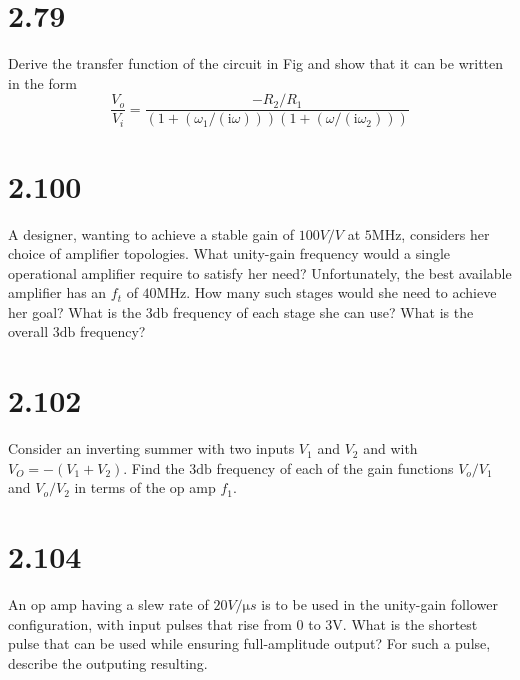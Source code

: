 \documentclass[12pt, a4paper]{article}
\newcommand{\svol}{\si{\volt}}
\newcommand{\sdb}{\si{\decibel}}
\newcommand{\img}{\mathrm{i}}
\begin{document}
\section{2.79}
Derive the transfer function of the circuit in Fig and show that it can be written in the form
\[
  \frac{V_o}{V_i} = \frac{-R_2/R_1}{\left(1+(\omega_1/(\img\omega))\right)\left(1+(\omega/(\img\omega_2))\right)}
\]


\section{2.100}
A designer, wanting to achieve a stable gain of $100 \si{V/V}$ at $5 \si{\mega\hertz}$, considers her choice of amplifier topologies. What unity-gain frequency would a single operational amplifier require to satisfy her need? Unfortunately, the best available amplifier has an $f_t$ of $40 \si{\mega\hertz}$. How many such stages would she need to achieve her goal? What is the $3\sdb$ frequency of each stage she can use? What is the overall $3\sdb$ frequency?

\section{2.102}
Consider an inverting summer with two inputs $V_1$ and $V_2$ and with $V_O = -(V_1 + V_2)$. Find the $3 \sdb$ frequency of each of the gain functions $V_o / V_1$ and $V_o / V_2$ in terms of the op amp $f_1$.

\section{2.104}
An op amp having a slew rate of $20 \si{V/\micro s}$ is to be used in the unity-gain follower configuration, with input pulses that rise from $0$ to $3\svol$. What is the shortest pulse that can be used while ensuring full-amplitude output? For such a pulse, describe the outputing resulting.
\end{document}
